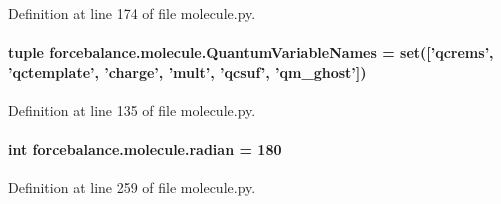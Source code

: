 Definition at line 174 of file molecule.\-py.

\hypertarget{namespaceforcebalance_1_1molecule_ab67efeab6049ec1f416b9ad1eed6ffcc}{
\paragraph[{Quantum\-Variable\-Names}]{\setlength{\rightskip}{0pt plus 5cm}tuple forcebalance.\-molecule.\-Quantum\-Variable\-Names = set(\mbox{[}'qcrems', 'qctemplate', 'charge', 'mult', 'qcsuf', 'qm\-\_\-ghost'\mbox{]})}}\label{namespaceforcebalance_1_1molecule_ab67efeab6049ec1f416b9ad1eed6ffcc}


Definition at line 135 of file molecule.\-py.

\hypertarget{namespaceforcebalance_1_1molecule_a1ee5389ce8a9042e053c7972dbbfb005}{
\paragraph[{radian}]{\setlength{\rightskip}{0pt plus 5cm}int forcebalance.\-molecule.\-radian = 180}}\label{namespaceforcebalance_1_1molecule_a1ee5389ce8a9042e053c7972dbbfb005}


Definition at line 259 of file molecule.\-py.

